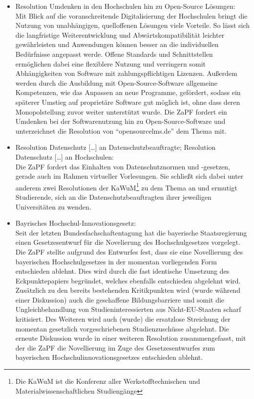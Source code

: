 \documentclass[a4paper, 11pt]{scrartcl}
\begin{document}
\begin{itemize}
		\item Resolution Umdenken in den Hochschulen hin zu Open-Source Lösungen:\\
Mit Blick auf die voranschreitende Digitalisierung der Hochschulen bringt die Nutzung von unabhängigen, quelloffenen Lösungen viele Vorteile. So lässt sich die langfristige Weiterentwicklung und Abwärtskompatibilität leichter gewährleisten und Anwendungen können besser an die individuellen Bedürfnisse angepasst werde. Offene Standards und Schnittstellen ermöglichen dabei eine flexiblere Nutzung und verringern somit Abhängigkeiten von Software mit zahlungspflichtigen Lizenzen. Außerdem werden durch die Ausbildung mit Open-Source-Software allgemeine Kompetenzen, wie das Anpassen an neue Programme, gefördert, sodass ein späterer Umstieg auf proprietäre Software gut möglich ist, ohne dass deren Monopolstellung zuvor weiter unterstützt wurde. Die ZaPF fordert ein Umdenken bei der Softwarenutzung hin zu Open-Source-Software und unterzeichnet die Resolution von “opensourcelms.de” dem Thema mit.

		\item Resolution Datenschutz […] an Datenschutzbeauftragte; Resolution Datenschutz […] an Hochschulen:\\
Die ZaPF fordert das Einhalten von Datenschutznormen und -gesetzen, gerade auch im Rahmen virtueller Vorlesungen. Sie schließt sich dabei unter anderem zwei Resolutionen der KaWuM\footnote{Die KaWuM ist die Konferenz aller Werkstofftechnischen und Materialwissenschaftlichen Studiengänge} zu dem Thema an und ermutigt Studierende, sich an die Datenschutzbeauftragten ihrer jeweiligen Universitäten zu wenden.

		\item Bayrisches Hochschul-Innovationsgesetz:\\
Seit der letzten Bundesfachschaftentagung hat die bayerische Staatsregierung einen Gesetzesentwurf für die Novelierung des Hochschulgesetzes vorgelegt. Die ZaPF stellte aufgrund des Entwurfes fest, dass sie eine Novellierung des bayerischen Hochschulgesetzes in der momentan vorliegenden Form entschieden ablehnt. Dies wird durch die fast identische Umsetzung des Eckpunktepapiers begründet, welches ebenfalls entschieden abgelehnt wird. Zusätzlich zu den bereits bestehenden Kritikpunkten wird (wurde während einer Diskussion) auch die geschaffene Bildungsbarriere und somit die Ungleichbehandlung von Studieninteressierten aus Nicht-EU-Staaten scharf kritisiert. Des Weiteren wird auch (wurde) die ersatzlose Streichung der momentan gesetzlich vorgeschriebenen Studienzuschüsse abgelehnt. Die erneute Diskussion wurde in einer weiteren Resolution zusammengefasst, mit der die ZaPF die Novellierung im Zuge des Gesetzesentwurfes zum bayerischen Hochschulinnovationsgesetzes entschieden ablehnt.


\end{itemize}
\end{document}
